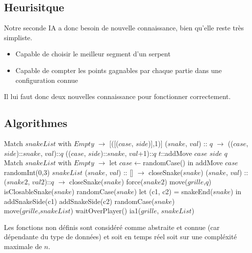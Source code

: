 \documentclass[a4paper,12pt]{report}
\begin{document}
\subsection{Heurisitque}

Notre seconde IA a donc besoin de nouvelle connaissance, bien qu'elle reste tr\`es simpliste.

\begin{itemize}
 \item Capable de choisir le meilleur segment d'un serpent
 \item Capable de compter les points gagnables par chaque partie dans une configuration connue
\end{itemize}

Il lui faut donc deux nouvelles connaissance pour fonctionner correctement.

\subsection{Algorithmes}

\begin{algorithmic}
	\State Match $snakeList$ with
	\State $Empty$ $\rightarrow$ [([($case$, $side$)],1)]
	\State ($snake$, $val$) :: $q$ $\rightarrow$
				\State (($case$, $side$)::$snake$, $val$)::$q$
			\Else
				\State (($case$, $side$)::$snake$, $val$+1)::$q$
			\EndIf
		\Else
			\State $t$::addMove $case$ $side$ $q$
		\EndIf
\EndFunction
\\
	\State Match $snakeList$ with
	\State $Empty$ $\rightarrow$ let $case\gets$randomCase() in addMove $case$ randomInt(0,3) $snakeList$
	\State ($snake$, $val$) :: [] $\rightarrow$
			\State closeSnake($snake$)
		\EndIf
	\State ($snake$, $val$) :: ($snake2$, $val2$)::$q$ $\rightarrow$
			\State closeSnake($snake$)
		\Else
				\State force($snake2$)
			\Else
				\State move($grille$,$q$)
			\EndIf
		\EndIf
\EndFunction
\\
	\If isClosableSnake($snake$)
		\State randomCase($snake$)
	\EndIf
	\State let (c1, c2) = snakeEnd($snake$) in
		\State addSnakeSide(c1)
	\Else
			\State addSnakeSide(c2)
			\Else randomCase($snake$)
		\EndIf
	\EndIf
\EndFunction
\\
	\State move($grille$,$snakeList$)
	\State waitOverPlayer()
	\State ia1($grille$, $snakeList$)
\EndFunction
\end{algorithmic}
Les fonctions non d\'efinis sont consid\'er\'e comme abstraite et connue (car d\'ependante du type de donn\'ees) et soit en temps r\'eel soit sur une compl\'exit\'e maximale de $n$. 
\end{document}
